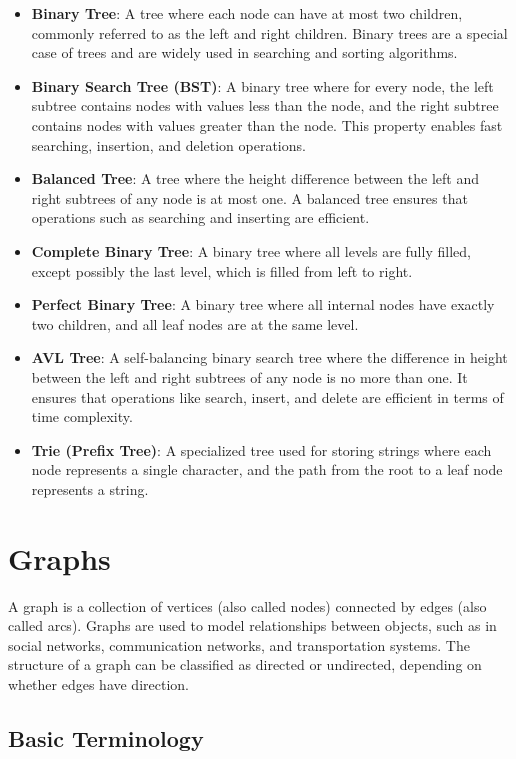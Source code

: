 \documentclass{book}
\begin{document}
\begin{itemize}
    \item \textbf{Binary Tree}: A tree where each node can have at most two children, commonly referred to as the left and right children. Binary trees are a special case of trees and are widely used in searching and sorting algorithms.
    \item \textbf{Binary Search Tree (BST)}: A binary tree where for every node, the left subtree contains nodes with values less than the node, and the right subtree contains nodes with values greater than the node. This property enables fast searching, insertion, and deletion operations.
    \item \textbf{Balanced Tree}: A tree where the height difference between the left and right subtrees of any node is at most one. A balanced tree ensures that operations such as searching and inserting are efficient.
    \item \textbf{Complete Binary Tree}: A binary tree where all levels are fully filled, except possibly the last level, which is filled from left to right.
    \item \textbf{Perfect Binary Tree}: A binary tree where all internal nodes have exactly two children, and all leaf nodes are at the same level.
    \item \textbf{AVL Tree}: A self-balancing binary search tree where the difference in height between the left and right subtrees of any node is no more than one. It ensures that operations like search, insert, and delete are efficient in terms of time complexity.
    \item \textbf{Trie (Prefix Tree)}: A specialized tree used for storing strings where each node represents a single character, and the path from the root to a leaf node represents a string.
\end{itemize}

\section{Graphs}

A graph is a collection of vertices (also called nodes) connected by edges (also called arcs). Graphs are used to model relationships between objects, such as in social networks, communication networks, and transportation systems. The structure of a graph can be classified as directed or undirected, depending on whether edges have direction.

\subsection{Basic Terminology}
\end{document}
